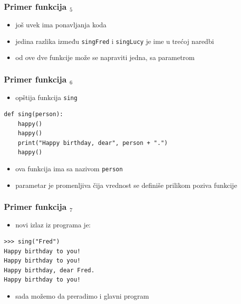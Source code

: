 \documentclass[utf8,compress]{beamer}
\begin{document}
\begin{frame}[fragile]
  \frametitle{Primer funkcija $_5$}
  \begin{itemize}
    \item još uvek ima ponavljanja koda
    \item jedina razlika između \texttt{singFred} i \texttt{singLucy} je ime u trećoj naredbi
    \item od ove dve funkcije može se napraviti jedna, sa parametrom
  \end{itemize}
\end{frame}

\begin{frame}[fragile]
  \frametitle{Primer funkcija $_6$}
  \begin{itemize}
    \item opštija funkcija \texttt{sing} 
  \end{itemize}
\begin{verbatim}
def sing(person):
    happy()
    happy()
    print("Happy birthday, dear", person + ".")
    happy()
\end{verbatim}
  \begin{itemize}
    \item ova funkcija ima  sa nazivom \texttt{person}
    \item parametar je promenljiva čija vrednost se definiše prilikom poziva funkcije
  \end{itemize}
\end{frame}

\begin{frame}[fragile]
  \frametitle{Primer funkcija $_7$}
  \begin{itemize}
    \item novi izlaz iz programa je:
  \end{itemize}
\begin{verbatim}
>>> sing("Fred")
Happy birthday to you!
Happy birthday to you!
Happy birthday, dear Fred.
Happy birthday to you!
\end{verbatim}
  \begin{itemize}
    \item sada možemo da preradimo i glavni program
  \end{itemize}
\end{frame}
\end{document}
